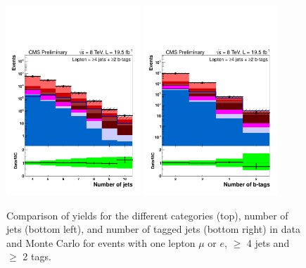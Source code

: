 \begin{figure}[hbtp]
\begin{center}
 \includegraphics[width=0.45\textwidth]{Figures/Analysis_2_Diagrams/LJ_plots_lep/lep_numJet_cumulative_wRatio_noLegend_log.pdf}
 \includegraphics[width=0.45\textwidth]{Figures/Analysis_2_Diagrams/LJ_plots_lep/lep_numTag_cumulative_wRatio_noLegend_log.pdf}
   \caption{Comparison of yields for the different categories (top), number of jets (bottom left), and number of tagged jets (bottom right) in data and Monte Carlo for events
    with one lepton $\mu$ or $e$, $\ge$ 4 jets and $\ge$ 2 tags.  }
   \label{fig:LJ_numJets_numTags}
 \end{center}
\end{figure}


